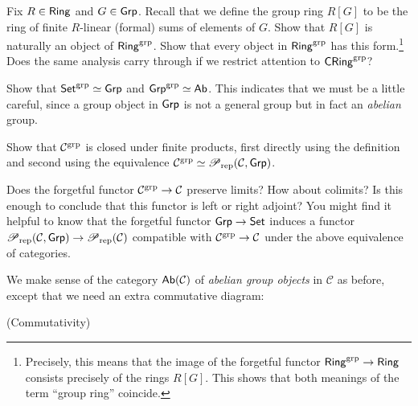 \documentclass[11pt]{article}
\renewcommand{\C}{\mathcal{C}}
\begin{document}
\begin{exercise}
Fix $R\in\operatorname{\mathsf{Ring}}$ and $G\in\operatorname{\mathsf{Grp}}$. Recall that we define the group ring $R[G]$ to be the ring of finite $R$-linear (formal) sums of elements of $G$. Show that $R[G]$ is naturally an object of $\operatorname{\mathsf{Ring}}^{\operatorname{grp}}$. Show that every object in $\operatorname{\mathsf{Ring}}^{\operatorname{grp}}$ has this form.\footnote{Precisely, this means that the image of the forgetful functor $\operatorname{\mathsf{Ring}}^{\operatorname{grp}}\to\operatorname{\mathsf{Ring}}$ consists precisely of the rings $R[G]$. This shows that both meanings of the term ``group ring'' coincide.} Does the same analysis carry through if we restrict attention to $\operatorname{\mathsf{CRing}}^{\operatorname{grp}}$?
\end{exercise}

\begin{exercise}
Show that $\operatorname{\mathsf{Set}}^{\operatorname{grp}}\simeq\operatorname{\mathsf{Grp}}$ and $\operatorname{\mathsf{Grp}}^{\operatorname{grp}}\simeq\operatorname{\mathsf{Ab}}$. This indicates that we must be a little careful, since a group object in $\operatorname{\mathsf{Grp}}$ is not a general group but in fact an \emph{abelian} group.
\end{exercise}

\begin{exercise}
Show that $\C^{\grp}$ is closed under finite products, first directly using the definition and second using the equivalence $\C^{\grp}\simeq\Pre_{\rep}(\C,\Grp)$.
\end{exercise}

\begin{exercise}
Does the forgetful functor $\C^{\grp}\to\C$ preserve limits? How about colimits? Is this enough to conclude that this functor is left or right adjoint? You might find it helpful to know that the forgetful functor $\operatorname{\mathsf{Grp}}\to\operatorname{\mathsf{Set}}$ induces a functor $\Pre_{\rep}(\C,\Grp)\to\Pre_{\rep}(\C)$ compatible with $\C^{\grp}\to\C$ under the above equivalence of categories.
\end{exercise}

We make sense of the category $\Ab(\C)$ of \emph{abelian group objects} in $\C$ as before, except that we need an extra commutative diagram:

\begin{enum}{\roman}
\item[] (Commutativity)

\begin{center}
\end{center}
\end{enum}
\end{document}
